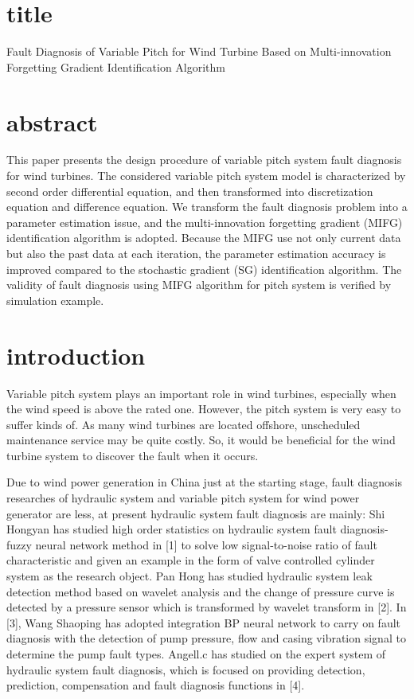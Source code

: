 \documentclass[a4paper]{article}
\begin{document}
\section{title}

Fault Diagnosis of Variable Pitch for Wind Turbine Based on Multi-innovation Forgetting Gradient  Identification Algorithm

\section{abstract}

This paper presents the design procedure of variable pitch system fault diagnosis for wind turbines. 
The considered variable pitch system model is characterized by second order differential equation, and then transformed into discretization equation and difference equation. We transform the fault diagnosis problem into a parameter estimation issue, and the multi-innovation forgetting gradient (MIFG) identification algorithm is adopted. Because the MIFG use not only current data but also the past data at each iteration, the parameter estimation accuracy is improved compared to the stochastic gradient (SG) identification algorithm.
The validity of fault diagnosis using MIFG algorithm for pitch system is verified by simulation example.

\section{introduction}

Variable pitch system plays an important role in wind turbines, especially when the wind speed is above the rated one. However, the pitch system is very easy to suffer kinds of. As many wind turbines are located offshore, unscheduled maintenance service may be quite costly. So, it would be beneficial for the wind turbine system to discover the fault when it occurs.

Due to wind power generation in China just at
the starting stage, fault diagnosis researches of hydraulic
system and variable pitch system for wind power generator are
less, at present hydraulic system fault diagnosis are mainly:
Shi Hongyan has studied high order statistics on hydraulic
system fault diagnosis-fuzzy neural network method in [1] to
solve low signal-to-noise ratio of fault characteristic and given
an example in the form of valve controlled cylinder system as
the research object.  Pan Hong has studied hydraulic system
leak detection method based on wavelet analysis and the
change of pressure curve is detected by a pressure sensor
which is transformed by wavelet transform in [2].  In [3],
Wang Shaoping has adopted integration BP neural network to
carry on fault diagnosis with the detection of pump pressure,
flow and casing vibration signal to determine the pump fault
types. Angell.c has studied on the expert system of hydraulic
system fault diagnosis, which is focused on providing
detection, prediction, compensation and fault diagnosis
functions in [4].
\end{document}
